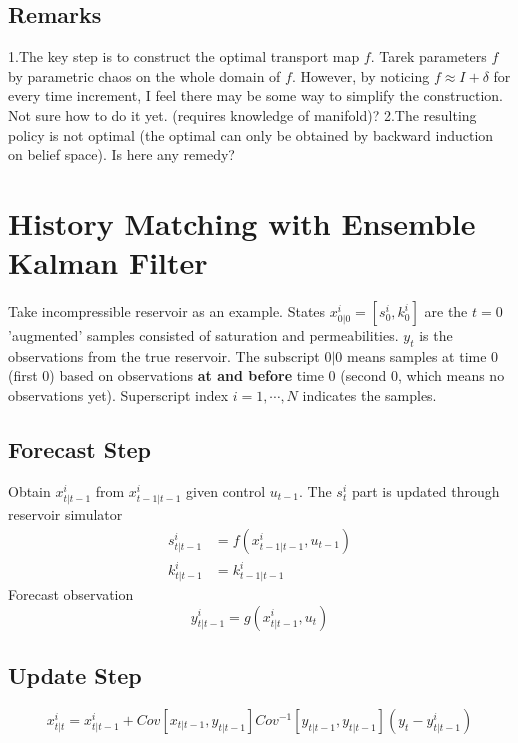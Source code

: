 \documentclass[a4paper,onecolumn]{article}
\begin{document}
\subsection{Remarks}
1.The key step is to construct the optimal transport map $f$. Tarek
parameters $f$ by parametric chaos on the whole domain of $f$. However, by
noticing $f\approx I + \delta$ for every time increment, I feel there
may be some way to simplify the construction. Not sure how to do it yet.
(requires knowledge of manifold)?
2.The resulting policy is not optimal (the optimal can only be obtained by
backward induction on belief space). Is here any remedy?

\section{History Matching with Ensemble Kalman Filter}
Take incompressible reservoir as an example.
States $x_{0|0}^i = [s_0^i, k_0^i]$ are the $t=0$ 'augmented' samples
consisted of saturation and permeabilities. $y_t$ is the observations
from the true reservoir. The subscript $0|0$ means samples at time $0$
(first 0) based on observations \textbf{at and before} time $0$ (second 0, which
means no observations yet). Superscript index $i=1,\cdots,N$ indicates
the samples.
\subsection{Forecast Step}
Obtain $x_{t|t-1}^i$ from $x_{t-1|t-1}^i$ given control $u_{t-1}$.
The $s_t^i$ part is updated through reservoir simulator
\begin{equation}\begin{split}
    s_{t|t-1}^i &= f(x_{t-1|t-1}^i, u_{t-1})\\
	k_{t|t-1}^i &= k_{t-1|t-1}^i
\end{split}\end{equation}
Forecast observation
\begin{equation}
    y_{t|t-1}^i = g(x^i_{t|t-1},u_t)
\end{equation}
\subsection{Update Step}
\begin{equation}
x_{t|t}^i = x_{t|t-1}^i + Cov[x_{t|t-1}, y_{t|t-1}]
Cov^{-1}[y_{t|t-1},y_{t|t-1}]\left(y_t - y_{t|t-1}^i\right)
\end{equation}
\end{document}
